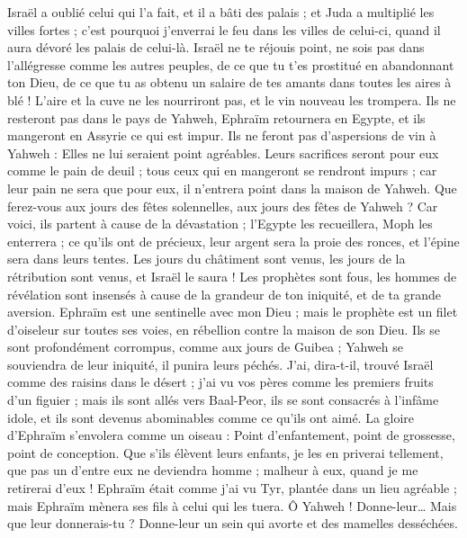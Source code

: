 \begin{multicols}{2}
Israël a oublié celui qui l'a fait, et il a bâti des palais ; et Juda a multiplié les villes fortes ; c'est pourquoi j'enverrai le feu dans les villes de celui-ci, quand il aura dévoré les palais de celui-là.
\VerseOne{}Israël ne te réjouis point, ne sois pas dans l'allégresse comme les autres peuples, de ce que tu t'es prostitué en abandonnant ton Dieu, de ce que tu as obtenu un salaire de tes amants dans toutes les aires à blé !
L'aire et la cuve ne les nourriront pas, et le vin nouveau les trompera.
Ils ne resteront pas dans le pays de Yahweh, Ephraïm retournera en Egypte, et ils mangeront en Assyrie ce qui est impur.
Ils ne feront pas d'aspersions de vin à Yahweh : Elles ne lui seraient point agréables. Leurs sacrifices seront pour eux comme le pain de deuil ; tous ceux qui en mangeront se rendront impurs ; car leur pain ne sera que pour eux, il n'entrera point dans la maison de Yahweh.
Que ferez-vous aux jours des fêtes solennelles, aux jours des fêtes de Yahweh ?
Car voici, ils partent à cause de la dévastation ; l'Egypte les recueillera, Moph les enterrera ; ce qu'ils ont de précieux, leur argent sera la proie des ronces, et l'épine sera dans leurs tentes.
Les jours du châtiment sont venus, les jours de la rétribution sont venus, et Israël le saura ! Les prophètes sont fous, les hommes de révélation sont insensés à cause de la grandeur de ton iniquité, et de ta grande aversion.
Ephraïm est une sentinelle avec mon Dieu ; mais le prophète est un filet d'oiseleur sur toutes ses voies, en rébellion contre la maison de son Dieu.
Ils se sont profondément corrompus, comme aux jours de Guibea ; Yahweh se souviendra de leur iniquité, il punira leurs péchés.
J'ai, dira-t-il, trouvé Israël comme des raisins dans le désert ; j'ai vu vos pères comme les premiers fruits d'un figuier ; mais ils sont allés vers Baal-Peor, ils se sont consacrés à l'infâme idole, et ils sont devenus abominables comme ce qu'ils ont aimé.
La gloire d'Ephraïm s'envolera comme un oiseau : Point d'enfantement, point de grossesse, point de conception.
Que s'ils élèvent leurs enfants, je les en priverai tellement, que pas un d'entre eux ne deviendra homme ; malheur à eux, quand je me retirerai d'eux !
Ephraïm était comme j'ai vu Tyr, plantée dans un lieu agréable ; mais Ephraïm mènera ses fils à celui qui les tuera.
Ô Yahweh ! Donne-leur… Mais que leur donnerais-tu ? Donne-leur un sein qui avorte et des mamelles desséchées.

\end{multicols}
